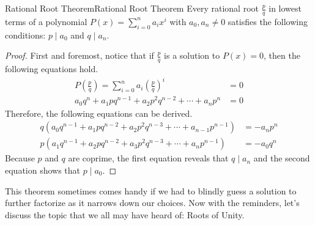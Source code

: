 \documentclass[../../../main.tex]{subfiles}
\begin{document}
\begin{theorem}{Rational Root Theorem}{Rational Root Theorem}
Every rational root $\frac{p}{q}$ in lowest terms of a polynomial
$P(x) = \sum_{i=0}^n a_i x^i$ with $a_0, a_n \neq 0$ satisfies the
following conditions: $p \mid a_0$ and $q \mid a_n$.
\end{theorem}
\begin{proof}
First and foremost, notice that if $\frac{p}{q}$ is a solution to
$P(x) = 0$, then the following equations hold.
\begin{align*}
    P \left( \frac{p}{q} \right)
    = \sum_{i=0}^n a_i \left( \frac{p}{q} \right)^i
    &= 0 \\
    a_0 q^n + a_1 p q^{n-1} + a_2 p^2 q^{n-2} + \cdots + a_n p^n
    &= 0
\end{align*}
Therefore, the following equations can be derived.
\begin{align*}
    q \left( a_0 q^{n-1} + a_1 p q^{n-2} + a_2 p^2 q^{n-3} +
        \cdots + a_{n-1} p^{n-1}
    \right)
    &= -a_n p^n \\
    p \left( a_1 q^{n-1} + a_2 p q^{n-2} + a_3 p^2 q^{n-3} +
        \cdots + a_n p^{n - 1}
    \right)
    &= -a_0 q^n
\end{align*}
Because $p$ and $q$ are coprime, the first equation reveals that
$q \mid a_n$ and the second equation shows that $p \mid a_0$.
\end{proof}

This theorem sometimes comes handy if we had to blindly guess
a solution to further factorize as it narrows down our choices.
Now with the reminders, let's discuss the topic that we all may
have heard of: Roots of Unity.
\end{document}
